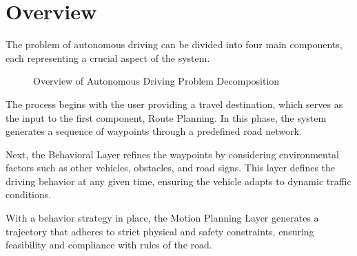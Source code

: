 \chapter{Overview}

The problem of autonomous driving can be divided into four main components, each representing a crucial aspect of the system.

\begin{figure}[h!]
	\centering
	\caption{Overview of Autonomous Driving Problem Decomposition}
	\label{fig:autonomous_driving_overview}
\end{figure}

The process begins with the user providing a travel destination, which serves as the input to the first component, Route Planning.
In this phase, the system generates a sequence of waypoints through a predefined road network.

Next, the Behavioral Layer refines the waypoints by considering environmental factors such as other vehicles, obstacles, and road signs.
This layer defines the driving behavior at any given time, ensuring the vehicle adapts to dynamic traffic conditions.

With a behavior strategy in place, the Motion Planning Layer generates a trajectory that adheres to strict physical and safety constraints, ensuring
feasibility and compliance with rules of the road.

